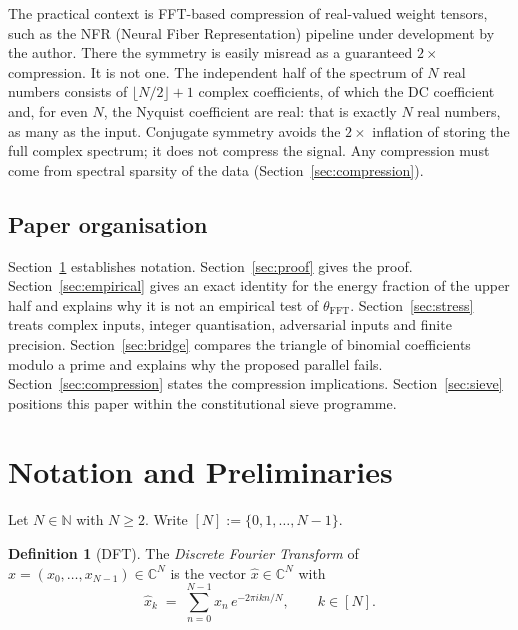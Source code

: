 \documentclass[12pt]{article}
\theoremstyle{definition}
\newtheorem{definition}[theorem]{Definition}
\newcommand{\N}{\mathbb{N}}
\newcommand{\C}{\mathbb{C}}
\newcommand{\thetaFFT}{\theta_{\mathrm{FFT}}}
\begin{document}
The practical context is FFT-based compression of real-valued weight
tensors, such as the NFR (Neural Fiber Representation) pipeline under
development by the author.  There the symmetry is easily misread as a
guaranteed $2\times$ compression.  It is not one.  The independent half
of the spectrum of $N$ real numbers consists of $\lfloor N/2 \rfloor + 1$
complex coefficients, of which the DC coefficient and, for even $N$, the
Nyquist coefficient are real: that is exactly $N$ real numbers, as many
as the input.  Conjugate symmetry avoids the $2\times$ inflation of
storing the full complex spectrum; it does not compress the signal.  Any
compression must come from spectral sparsity of the data
(Section~\ref{sec:compression}).

\subsection{Paper organisation}

Section~\ref{sec:notation} establishes notation.
Section~\ref{sec:proof} gives the proof.
Section~\ref{sec:empirical} gives an exact identity for the energy
fraction of the upper half and explains why it is not an empirical
test of $\thetaFFT$.
Section~\ref{sec:stress} treats complex inputs, integer quantisation,
adversarial inputs and finite precision.
Section~\ref{sec:bridge} compares the triangle of binomial coefficients
modulo a prime and explains why the proposed parallel fails.
Section~\ref{sec:compression} states the compression implications.
Section~\ref{sec:sieve} positions this paper within the
constitutional sieve programme.

\section{Notation and Preliminaries}
\label{sec:notation}

Let $N \in \N$ with $N \geq 2$.  Write $[N] := \{0, 1, \ldots, N-1\}$.

\begin{definition}[DFT]\label{def:dft}
The \emph{Discrete Fourier Transform} of $x = (x_0, \ldots, x_{N-1}) \in \C^N$
is the vector $\hat{x} \in \C^N$ with
\[
  \hat{x}_k \;=\; \sum_{n=0}^{N-1} x_n \, e^{-2\pi i k n / N},
  \qquad k \in [N].
\]
\end{definition}
\end{document}
